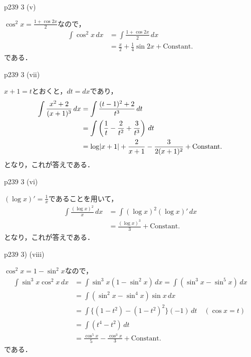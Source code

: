 \documentclass[dvipdfmx,uplatex,11pt]{jsarticle}
\DeclarePairedDelimiter\abs{\lvert}{\rvert}
\theoremstyle{definition}
\begin{document}
p239 3 (v)

\begin{leftbar}
    $\cos ^2 x = \frac{1+\cos 2x}{2}$なので，
    \begin{align*}
        \int \cos ^2 x \, dx & = \int \frac{1+\cos 2x}{2} \, dx \\
        & = \frac{x}{2}+\frac{1}{4} \sin 2x + \mathrm{Constant.}
    \end{align*}
    である．
\end{leftbar}

\newpage 

p239 3 (vii)

\begin{leftbar}
    $x+1 =t$とおくと，$dt=dx$であり，
    \begin{align*}
        \int \frac{x^2+2}{(x+1)^3} \, dx & = \int \frac{(t-1)^2+2}{t^3} \, dt \\
        & = \int \left (\frac{1}{t}-\frac{2}{t^2}+\frac{3}{t^3}\right) \, dt \\
        & = \log \abs{x+1}+\frac{2}{x+1}-\frac{3}{2(x+1)^2}+\mathrm{Constant.}
    \end{align*}
    となり，これが答えである．
\end{leftbar}

p239 3 (vi)

\begin{leftbar}
    $(\log x)' = \frac{1}{x}$であることを用いて，
    \begin{align*}
        \int \frac{(\log x)^2}{x} \, dx & = \int (\log x)^2 (\log x)' \, dx \\
        & = \frac{(\log x)^3}{3} + \mathrm{Constant.}
    \end{align*}
    となり，これが答えである．
\end{leftbar}


p239 3) (viii)

\begin{leftbar}
    $\cos ^2 x = 1- \sin ^2 x$なので，
    \begin{align*}
        \int \sin ^3 x \cos ^2 x \, dx & = \int \sin ^3 x (1-\sin ^2 x) \, dx = \int (\sin ^3 x - \sin ^5 x ) \, dx \\
        & = \int (\sin ^2 x - \sin ^4 x) \sin x \, dx \\
        & = \int \{ (1-t^2)- (1-t^2)^2 \} (-1) \, dt \quad (\cos x =t) \\
        & = \int (t^4 -t^2) \, dt \\
        & = \frac{\cos ^5 x}{5}-\frac{\cos ^3 x}{3}+\mathrm{Constant.}
    \end{align*}
    である．
\end{leftbar}
\end{document}
